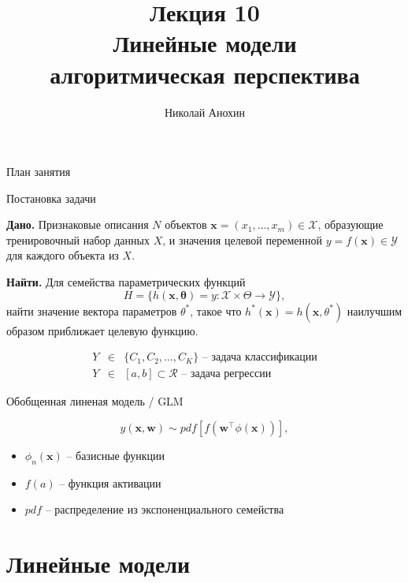 \documentclass[aspectratio=169]{beamer}
\author{Николай Анохин}
\title{\newline \newline \newline Лекция 10 \\ Линейные модели \\ алгоритмическая перспектива}
\let\otp\titlepage
\renewcommand{\titlepage}{\otp\addtocounter{framenumber}{-1}}
\begin{document}
\begin{frame}[plain]
\titlepage
\end{frame}

\begin{frame}{План занятия}
\tableofcontents
\end{frame}


\begin{frame}{Постановка задачи}

{\bf Дано.} Признаковые описания $N$ объектов $\mathbf{x} = (x_1, \ldots, x_m) \in \mathcal{X}$, образующие тренировочный набор данных $X$, и значения целевой переменной $y = f(\mathbf{x}) \in \mathcal{Y}$ для каждого объекта из $X$. 

\vspace{1em}
{\bf Найти.} Для семейства параметрических функций 
\[
H = \{h(\mathbf{x, \mathbf{\theta}}) = y: \mathcal{X} \times \Theta \rightarrow \mathcal{Y}\},
\]
найти значение вектора параметров $\theta^*$, такое что $h^*(\mathbf{x}) = h(\mathbf{x}, \theta^*)$ наилучшим образом приближает целевую функцию.

\begin{eqnarray*}
Y & \in & \{C_1, C_2, \ldots, C_K\} \text{ -- задача классификации}  \\
Y & \in & [a, b] \subset \mathcal{R} \text{ -- задача регрессии}
\end{eqnarray*}

\end{frame}

\begin{frame}{Обобщенная линеная модель / GLM}

\[
y(\mathbf{x}, \mathbf{w}) \sim pdf\left[ f(\mathbf{w}^\top \phi(\mathbf{x})) \right],
\]
\begin{itemize}
\item $\phi_n(\mathbf{x})$ -- базисные функции
\item $f(a)$ -- функция активации
\item $pdf$ -- распределение из экспоненциального семейства
\end{itemize}

\end{frame}


\section{Линейные модели}

\end{document}
